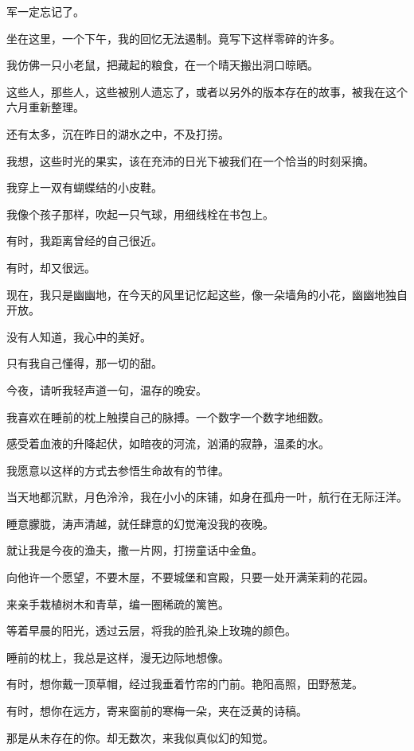 		军一定忘记了。


		\vspace{1em}
		坐在这里，一个下午，我的回忆无法遏制。竟写下这样零碎的许多。\par
		我仿佛一只小老鼠，把藏起的粮食，在一个晴天搬出洞口晾晒。\par
		这些人，那些人，这些被别人遗忘了，或者以另外的版本存在的故事，被我在这个六月重新整理。\par
		还有太多，沉在昨日的湖水之中，不及打捞。\par
		我想，这些时光的果实，该在充沛的日光下被我们在一个恰当的时刻采摘。

		我穿上一双有蝴蝶结的小皮鞋。\par
		我像个孩子那样，吹起一只气球，用细线栓在书包上。

		有时，我距离曾经的自己很近。\par
		有时，却又很远。

		现在，我只是幽幽地，在今天的风里记忆起这些，像一朵墙角的小花，幽幽地独自开放。\par
		没有人知道，我心中的美好。\par
		只有我自己懂得，那一切的甜。

	\endwriting




		今夜，请听我轻声道一句，温存的晚安。

		\vspace{1em}
		我喜欢在睡前的枕上触摸自己的脉搏。一个数字一个数字地细数。\par
		感受着血液的升降起伏，如暗夜的河流，汹涌的寂静，温柔的水。

		我愿意以这样的方式去参悟生命故有的节律。

		当天地都沉默，月色泠泠，我在小小的床铺，如身在孤舟一叶，航行在无际汪洋。\par
		睡意朦胧，涛声清越，就任肆意的幻觉淹没我的夜晚。\par
		就让我是今夜的渔夫，撒一片网，打捞童话中金鱼。\par
		向他许一个愿望，不要木屋，不要城堡和宫殿，只要一处开满茉莉的花园。\par
		来亲手栽植树木和青草，编一圈稀疏的篱笆。\par
		等着早晨的阳光，透过云层，将我的脸孔染上玫瑰的颜色。

		睡前的枕上，我总是这样，漫无边际地想像。

		有时，想你戴一顶草帽，经过我垂着竹帘的门前。艳阳高照，田野葱茏。\par
		有时，想你在远方，寄来窗前的寒梅一朵，夹在泛黄的诗稿。\par
		那是从未存在的你。却无数次，来我似真似幻的知觉。

